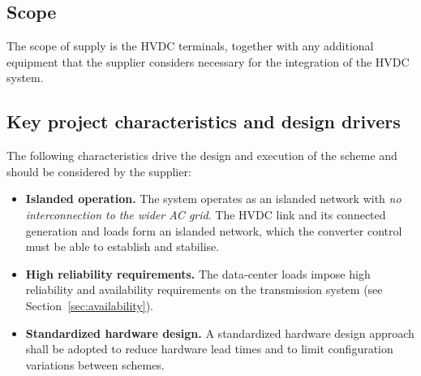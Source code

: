 \subsection{Scope}
\label{sec:scope}
The scope of supply is the HVDC terminals, together with any additional
equipment that the supplier considers necessary for the integration of the
HVDC system.



\subsection{Key project characteristics and design drivers}
The following characteristics drive the design and execution of the scheme and
should be considered by the supplier:
\begin{itemize}\setlength{\itemsep}{0.35em}
  \item \textbf{Islanded operation.} The system operates as an islanded network
        with \emph{no interconnection to the wider AC grid}. The HVDC link and
        its connected generation and loads form an islanded network,
        which the converter control must be able to establish and stabilise.
  \item \textbf{High reliability requirements.} The data-center loads impose
        high reliability and availability requirements on the
        transmission system (see Section~\ref{sec:availability}).
  \item \textbf{Standardized hardware design.} A standardized hardware
        design approach shall be adopted to reduce hardware lead times and to
        limit configuration variations between schemes.
\end{itemize}



